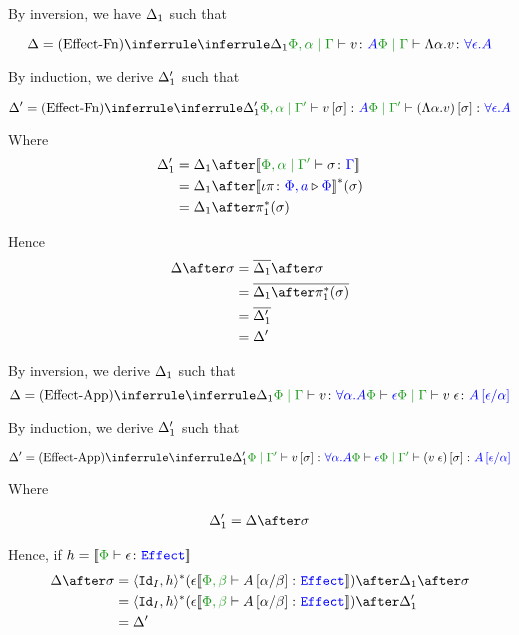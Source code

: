 {

By inversion, we have $\Delta_1$ such that

\begin{equation}
    \D = \ntreeruleI{Effect-Fn}{\treeruleI{\D_1}{\etyperelation{\P,\a}{\G}{v}{A}}}{\gpetyperelation{\elam{\a}{v}}{\all{\e}{A}}}
\end{equation}

By induction, we derive $\Delta_1'$ such that

\begin{equation}
    \D' = \ntreeruleI{Effect-Fn}{\treeruleI{\D_1'}{\etyperelation{\P,\a}{\G'}{v\ssi}{A}}}{\etyperelation{\P}{\G'}{(\elam{\a}{v})\ssi}{\all{\e}{A}}}
\end{equation}

Where 
\begin{align}
    \D_1' & = \D_1\after\deno{\etyperelation{\P,\a}{\G'}{\si}{\G}}\\
    & = \D_1\after\deno{\wrel{\i\pi}{\P,a}{\P}}\star(\si)\\
    & = \D_1\after\pstar(\si)
\end{align}

Hence \begin{align}
    \D\after\si & = \bar{\D_1}\after\si\\
    & = \bar{\D_1\after\pstar(\si)}\\
    & = \bar{\D_1'}\\
    & = \D'
\end{align}

By inversion, we derive $\Delta_1$ such that
\begin{equation}
    \D = \ntreeruleII{Effect-App}{\treeruleI{\D_1}{\etyperelation{\P}{\G}{v}{\all{\a}{A}}}}{\wellformed{\P}{\e}}{\etyperelation{\P}{\G}{\eapp{v}{\e}}{A\ssub{\a}{\e}}}
\end{equation}

By induction, we derive $\Delta_1'$ such that

\begin{equation}
    \D' = \ntreeruleII{Effect-App}{\treeruleI{\D_1'}{\etyperelation{\P}{\G'}{v\ssi}{\all{\a}{A}}}}{\wellformed{\P}{\e}}{\etyperelation{\P}{\G'}{(\eapp{v}{\e})\ssi}{A\ssub{\a}{\e}}}
\end{equation}

Where 

\begin{align}
    \D_1' = \D\after\si
\end{align}



Hence, if $h = \deno{\typerelation{\P}{\e}{\effect}}$
\begin{align}
    \D\after\si &= \pr{\Id{I}}{h}\star(\e{\deno{\typerelation{\P,\b}{A\ssub{\b}{\a}}{\effect}}})\after\D_1\after\si\\
    &= \pr{\Id{I}}{h}\star(\e{\deno{\typerelation{\P,\b}{A\ssub{\b}{\a}}{\effect}}})\after\D_1'\\
    & = \D'
\end{align}

}

